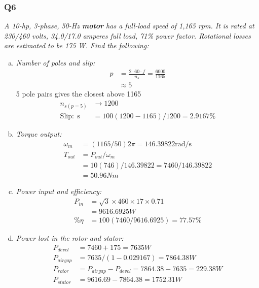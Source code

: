 \documentclass[a4paper,11pt]{article}
\begin{document}
\subsubsection*{Q6}

\textit{A 10-hp, 3-phase, 50-Hz \textbf{motor} has a full-load speed of 1,165 rpm. It is rated at 230/460 volts, 34.0/17.0 amperes full load, 71\% power factor. Rotational losses are estimated to be 175 W. Find the following:}

\begin{enumerate}[a)]
    \item \textit{Number of poles and slip:}\\
    \begin{align*}
        p &= \frac{2\cdot 60 \cdot f}{n_s} = \frac{6000}{1165}\\
        &\approx 5
    \end{align*}
    5 pole pairs gives the closest above 1165
    \begin{align*}
        n_{s(p=5)}&\rightarrow1200 \\
        \mathrm{Slip:\;s}&=100(1200-1165)/1200=2.9167\%
    \end{align*}

    \item \textit{Torque output:}\\
    \begin{align*}
        \omega_m &= (1165/50)2\pi = 146.39822 \mathrm{rad/s} \\
        T_{out} &= P_{out}/\omega_m \\
        &= 10(746)/146.39822=7460/146.39822
        \\&=50.96Nm
    \end{align*}

    \item \textit{Power input and efficiency:}\\
    \begin{align*}
        P_{in} &= \sqrt{3}\times460\times17\times0.71\\
        &=9616.6925W\\
        \%\eta &= 100(7460/9616.6925)=77.57\%
    \end{align*}

    \item \textit{Power lost in the rotor and stator:}\\
    \begin{align*}
        P_{devel} &= 7460+175=7635W\\ 
        P_{airgap} &= 7635/(1-0.029167)=7864.38W \\
        P_{rotor} &= P_{airgap}-P_{devel} = 7864.38-7635=229.38W \\
        P_{stator} &= 9616.69-7864.38=1752.31W
    \end{align*}
\end{enumerate}
\end{document}
